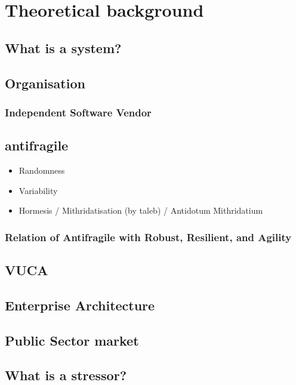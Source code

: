 \chapter{Theoretical background}
\label{ch:theoreticalbackground}

\section{What is a system?}
\label{sec:tbsystem}

\section{Organisation}
\label{sec:tborganisation}

\subsection{Independent Software Vendor}
\label{sub:tbisv}
\lipsum[1]

\section{antifragile}
\label{sec:tbantifragile}
\lipsum[1]

\begin{itemize}
	\item{Randomness}
	\item{Variability}
	\item{Hormesis / Mithridatisation (by taleb) / Antidotum Mithridatium}
\end{itemize}

\subsection{Relation of Antifragile with Robust, Resilient, and Agility}
\label{sub:tbrelatedtoantifragile}
\lipsum[1]

\section{VUCA}
\label{sec:tbvuca}
\lipsum[1]

\section{Enterprise Architecture}
\label{sec:tbea}
\lipsum[1]

\section{Public Sector market}
\label{sec:tbpsmarket}
\lipsum[1]

\section{What is a stressor?}
\label{sec:stressor}
\lipsum[1]



